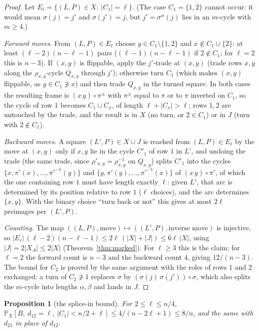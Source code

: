 \documentclass[11pt]{article}
\newtheorem{proposition}[theorem]{Proposition}
\theoremstyle{definition}
\renewcommand{\Pr}{\mathbb{P}}
\begin{document}
\begin{proof}
Let $E_\ell=\{(L,P)\in X:\ |C_1|=\ell\}$.  (The case $C_1=\{1,2\}$
cannot occur: it would mean $\sigma(j)=j'$ and $\sigma(j')=j$, but
$j'=\sigma^\alpha(j)$ lies in an $m$-cycle with $m\ge4$.)

\emph{Forward moves.}  From $(L,P)\in E_\ell$ choose $y\in C_1\setminus\{1,2\}$
and $x\notin C_1\cup\{2\}$: at least $(\ell-2)(n-\ell-1)$ pairs
($(\ell-1)(n-\ell-1)$ if $2\notin C_1$; for $\ell=2$ this is $n-3$).
If $(x,y)$ is flippable, apply the $j'$-trade at $(x,y)$ (trade rows $x,y$ along
the $\rho_{x,y}$-cycle $Q_{x,y}$ through $j'$); otherwise turn $C_1$ (which
makes $(x,y)$ flippable, as $y\in C_1\not\ni x$) and then trade
$Q_{x,y}$ in the turned square.  In both cases the resulting frame is
$(x\,y)\circ\pi^\pm$ with $\pi^\pm$ equal to $\pi$ or to $\pi$
inverted on $C_1$, so the cycle of row $1$ becomes $C_1\cup C_x$, of
length $\ell+|C_x|>\ell$; rows $1,2$ are untouched by the trade, and
the result is in $X$ (no turn, or $2\in C_1$) or in $J$ (turn with
$2\notin C_1$).

\emph{Backward moves.}  A square $(L',P)\in X\cup J$ is reached from
$(L,P)\in E_\ell$ by the move at $(x,y)$ only if $x,y$ lie in the cycle
$C'_1$ of row $1$ in $L'$, and undoing the trade (the same trade, since
$\rho'_{x,y}=\rho_{x,y}^{-1}$ on $Q_{x,y}$) splits $C'_1$ into the cycles
$\{x,\pi'(x),\dots,\pi'^{-1}(y)\}$ and $\{y,\pi'(y),\dots,\pi'^{-1}(x)\}$ of $(x\,y)\circ\pi'$, of which the one
containing row $1$ must have length exactly $\ell$: given $L'$, that
arc is determined by its position relative to row $1$ ($\ell$
choices), and the arc determines $\{x,y\}$.  With the binary choice
``turn back or not'' this gives at most $2\ell$ preimages per $(L',P)$.

\emph{Counting.}  The map $((L,P),\text{move})\mapsto((L',P),\text{inverse move})$
is injective, so
$|E_\ell|\,(\ell-2)(n-\ell-1)\le2\ell\,(|X|+|J|)\le6\ell\,|X|$, using
$|J|=2|X_A|\le2|X|$ (Theorem~\ref{thm:marked}).  For $\ell\ge3$ this
is the claim; for $\ell=2$ the forward count is $n-3$ and the backward
count $4$, giving $12/(n-3)$.  The bound for $C_2$ is proved by the
same argument with the roles of rows $1$ and $2$ exchanged: a turn of
$C_2\not\ni1$ replaces $\sigma$ by $(\sigma(j)\,\sigma(j'))\circ\sigma$,
which also splits the $m$-cycle into lengths $\alpha,\beta$ and lands
in $J$.
\end{proof}

\begin{proposition}[the splice-in bound]\label{prop:splice}
For $2\le\ell\le n/4$,
$\Pr_X[B,\ d_{12}=\ell,\ |C_1|<n/2+\ell]\le4/(n-2\ell+1)\le8/n$, and the same with
$d_{21}$ in place of $d_{12}$.
\end{proposition}
\end{document}
